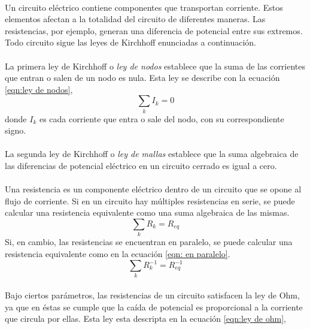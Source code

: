 \paragraph{}
Un circuito eléctrico contiene componentes que transportan corriente. Estos elementos afectan a la totalidad del circuito de diferentes maneras. Las resistencias, por ejemplo, generan una diferencia de potencial entre sus extremos. Todo circuito sigue las leyes de Kirchhoff enunciadas a continuación. 

\paragraph{}
La primera ley de Kirchhoff o \emph{ley de nodos} establece que la suma de las corrientes que entran o salen de un nodo es nula. Esta ley se describe con la ecuación \ref{eqn:ley de nodos},\cite{roederer}
\begin{equation}\label{eqn:ley de nodos}
    \sum_{k} I_k=0
\end{equation}
donde $I_k$ es cada corriente que entra o sale del nodo, con su correspondiente signo.
\paragraph{}
La segunda ley de Kirchhoff o \textit{ley de mallas} establece que la suma algebraica de las diferencias de potencial eléctrico en un circuito cerrado es igual a cero.

\paragraph{}
Una resistencia es un componente eléctrico dentro de un circuito que se opone al flujo de corriente. 
Si en un circuito hay múltiples resistencias en serie, se puede calcular una resistencia equivalente como una suma algebraica de las mismas. \cite{roederer}
\begin{equation}\label{eqn: en serie}
    \sum_k R_k=R_{eq}
\end{equation}
Si, en cambio, las resistencias se encuentran en paralelo, se puede calcular una resistencia equivalente como en la ecuación \ref{eqn: en paralelo}.
\begin{equation}\label{eqn: en paralelo}
    \sum_k R_{k}^{-1}=R_{eq}^{-1}
\end{equation}

\paragraph{}
Bajo ciertos parámetros, las resistencias de un circuito satisfacen la ley de Ohm, ya que en éstas se cumple que la caída de potencial es proporcional a la corriente que circula por ellas. Esta ley esta descripta en la ecuación \ref{eqn:ley de ohm},

